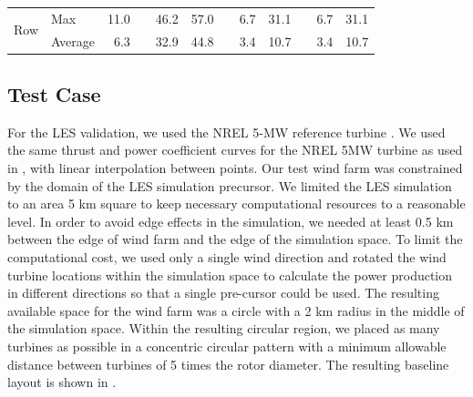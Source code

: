\documentclass[conf]{new-aiaa}
\begin{document}
\begin{table}[htpb!]
\begin{tabular}{@{}llrcrrcrrcrr@{}}


\multicolumn{1}{c|}{\multirow{2}{*}{Row}} &  \multicolumn{1}{l}{Max} & 11.0 & &  46.2 & 57.0 & & 6.7 & 31.1 & &6.7 & 31.1\\
\multicolumn{1}{c|}{} &  \multicolumn{1}{l}{Average} & 6.3& & 32.9 &44.8 & & 3.4 & 10.7 & & 3.4 & 10.7 \\

 \bottomrule
\end{tabular}

\end{table}

\subsection{Test Case}

For the LES validation, we used the NREL 5-MW reference turbine \cite{jonkman2009definition}. We used the same thrust and power coefficient curves for the NREL 5MW turbine as used in \cite{gebraad2017-max-aep}, with linear interpolation between points. Our test wind farm was constrained by the domain of the LES simulation precursor. We limited the LES simulation to an area 5 km square to keep necessary computational resources to a reasonable level. In order to avoid edge effects in the simulation, we needed at least 0.5 km between the edge of wind farm and the edge of the simulation space. To limit the computational cost, we used only a single wind direction and rotated the wind turbine locations within the simulation space to calculate the power production in different directions so that a single pre-cursor could be used. The resulting available space for the wind farm was a circle with a 2 km radius in the middle of the simulation space. Within the resulting circular region, we placed as many turbines as possible in a concentric circular pattern with a minimum allowable distance between turbines of 5 times the rotor diameter. The resulting baseline layout is shown in .    
\end{document}
